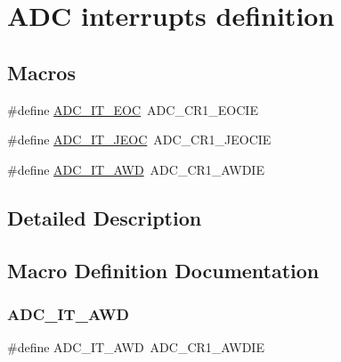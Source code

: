 \hypertarget{group___a_d_c__interrupts__definition}{}\section{A\+DC interrupts definition}
\label{group___a_d_c__interrupts__definition}
\subsection*{Macros}
\begin{DoxyCompactItemize}
\item 
\#define \hyperlink{group___a_d_c__interrupts__definition_ga0ad335d835f54415194d448019569e00}{A\+D\+C\+\_\+\+I\+T\+\_\+\+E\+OC}~A\+D\+C\+\_\+\+C\+R1\+\_\+\+E\+O\+C\+IE
\item 
\#define \hyperlink{group___a_d_c__interrupts__definition_gad439fc0cd69706704d47aeabfeddb631}{A\+D\+C\+\_\+\+I\+T\+\_\+\+J\+E\+OC}~A\+D\+C\+\_\+\+C\+R1\+\_\+\+J\+E\+O\+C\+IE
\item 
\#define \hyperlink{group___a_d_c__interrupts__definition_ga2f5c7f9900c24250a0c6ccaa7cbca946}{A\+D\+C\+\_\+\+I\+T\+\_\+\+A\+WD}~A\+D\+C\+\_\+\+C\+R1\+\_\+\+A\+W\+D\+IE
\end{DoxyCompactItemize}


\subsection{Detailed Description}


\subsection{Macro Definition Documentation}
\mbox{\label{group___a_d_c__interrupts__definition_ga2f5c7f9900c24250a0c6ccaa7cbca946}} 
\subsubsection{\texorpdfstring{A\+D\+C\+\_\+\+I\+T\+\_\+\+A\+WD}{ADC\_IT\_AWD}}
{\footnotesize\ttfamily \#define A\+D\+C\+\_\+\+I\+T\+\_\+\+A\+WD~A\+D\+C\+\_\+\+C\+R1\+\_\+\+A\+W\+D\+IE}


